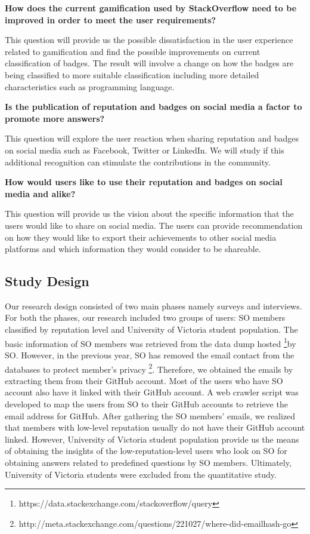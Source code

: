 \documentclass{sigchi}
\begin{document}
\textbf{How does the current gamification used by StackOverflow need to be improved in order to meet the user requirements?}

This question will provide us the possible dissatisfaction in the user experience related to gamification and find the possible improvements on current classification of badges. The result will involve a change on how the badges are being classified to more suitable classification including more detailed characteristics such as programming language.

\textbf{Is the publication of reputation and badges on social media a
factor to promote more answers?}

This question will explore the user reaction when sharing reputation and badges on social media such as Facebook, Twitter or LinkedIn. We will study if this additional recognition can stimulate the contributions in the community.

\textbf{How would users like to use their reputation and badges
on social media and alike?}

This question will provide us the vision about the specific information that the users would like to share on social media. The users can provide recommendation on how they would like to export their achievements to other social media platforms and which information they would consider to be shareable.

\subsection{Study Design}
Our research design consisted of two main phases namely surveys and interviews. For both the phases, our research included two groups of users: SO members classified by reputation level and University of Victoria student population. The basic information of SO members was retrieved from the data dump hosted \footnote{https://data.stackexchange.com/stackoverflow/query}by SO. However, in the previous year, SO has removed the email contact from the databases to protect member's privacy \footnote{http://meta.stackexchange.com/questions/221027/where-did-emailhash-go}. Therefore, we obtained the emails by extracting them from their GitHub account. Most of the users who have SO account also have it linked with their GitHub account. A web crawler script was developed to map the users from SO to their GitHub accounts to retrieve the email address for GitHub. After gathering the SO members' emails, we realized that members with low-level reputation usually do not have their GitHub account linked. However, University of Victoria student population provide us the means of obtaining the insights of the low-reputation-level users who look on SO for obtaining answers related to predefined questions by SO members. Ultimately, University of Victoria students were excluded from the quantitative study. 
\end{document}
